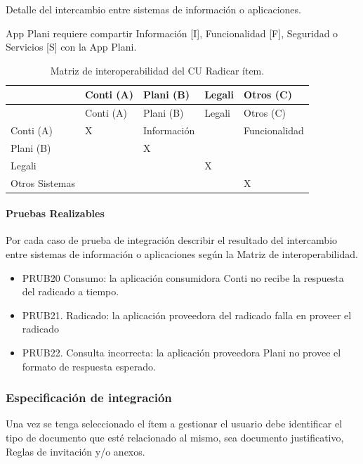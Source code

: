 \documentclass[
  paper=a4,
  ,captions=tableheading
]{scrartcl}
\providecommand{\tightlist}{%
  \setlength{\itemsep}{0pt}\setlength{\parskip}{0pt}}
\begin{document}
Detalle del intercambio entre sistemas de información o aplicaciones.

App Plani requiere compartir Información {[}I{]}, Funcionalidad {[}F{]},
Seguridad o Servicios {[}S{]} con la App Plani.

\begin{longtable}[]{@{}lllll@{}}
\caption{Matriz de interoperabilidad del CU Radicar
ítem.}\tabularnewline
\toprule\noalign{}
& Conti (A) & Plani (B) & Legali & Otros (C) \\
\midrule\noalign{}
\endfirsthead
\toprule\noalign{}
& Conti (A) & Plani (B) & Legali & Otros (C) \\
\midrule\noalign{}
\endhead
\bottomrule\noalign{}
\endlastfoot
Conti (A) & X & Información & & Funcionalidad \\
Plani (B) & & X & & \\
Legali & & & X & \\
Otros Sistemas & & & & X \\
\end{longtable}

\paragraph{Pruebas Realizables}\label{sec:pruebas-realizables-2}

Por cada caso de prueba de integración describir el resultado del
intercambio entre sistemas de información o aplicaciones según la Matriz
de interoperabilidad.

\begin{itemize}
\tightlist
\item
  PRUB20 Consumo: la aplicación consumidora Conti no recibe la respuesta
  del radicado a tiempo.
\item
  PRUB21. Radicado: la aplicación proveedora del radicado falla en
  proveer el radicado
\item
  PRUB22. Consulta incorrecta: la aplicación proveedora Plani no provee
  el formato de respuesta esperado.
\end{itemize}

\subsubsection{Especificación de
integración}\label{sec:especificaciuxf3n-de-integraciuxf3n-3}

Una vez se tenga seleccionado el ítem a gestionar el usuario debe
identificar el tipo de documento que esté relacionado al mismo, sea
documento justificativo, Reglas de invitación y/o anexos.
\end{document}
